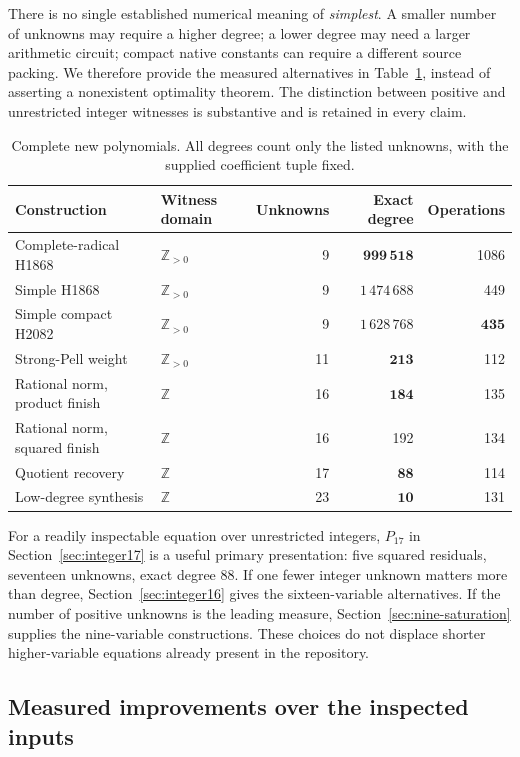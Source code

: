 \documentclass[11pt,a4paper]{article}
\newcommand{\Z}{\mathbb Z}
\newcommand{\Zp}{\mathbb Z_{>0}}
\theoremstyle{definition}
\theoremstyle{remark}
\numberwithin{equation}{section}
\begin{document}
There is no single established numerical meaning of \emph{simplest}. A smaller
number of unknowns may require a higher degree; a lower degree may need a
larger arithmetic circuit; compact native constants can require a different
source packing. We therefore provide the measured alternatives in
Table~\ref{tab:results}, instead of asserting a nonexistent optimality theorem.
The distinction between positive and unrestricted integer witnesses is
substantive and is retained in every claim.

\begin{table}[htbp]
\centering
\small
\begin{tabular}{llrrr}
\toprule
Construction & Witness domain & Unknowns & Exact degree & Operations\\
\midrule
Complete-radical H1868 & \(\Zp\) & 9 & \(\mathbf{999\,518}\) & 1086\\
Simple H1868 & \(\Zp\) & 9 & \(1\,474\,688\) & 449\\
Simple compact H2082 & \(\Zp\) & 9 & \(1\,628\,768\) & \(\mathbf{435}\)\\
Strong-Pell weight & \(\Zp\) & 11 & \(\mathbf{213}\) & 112\\
Rational norm, product finish & \(\Z\) & 16 & \(\mathbf{184}\) & 135\\
Rational norm, squared finish & \(\Z\) & 16 & 192 & 134\\
Quotient recovery & \(\Z\) & 17 & \(\mathbf{88}\) & 114\\
Low-degree synthesis & \(\Z\) & 23 & \(\mathbf{10}\) & 131\\
\bottomrule
\end{tabular}
\caption{Complete new polynomials. All degrees count only the listed
unknowns, with the supplied coefficient tuple fixed.}
\label{tab:results}
\end{table}

For a readily inspectable equation over unrestricted integers,
\(P_{17}\) in Section~\ref{sec:integer17} is a useful primary presentation:
five squared residuals, seventeen unknowns, exact degree 88. If one fewer
integer unknown matters more than degree, Section~\ref{sec:integer16}
gives the sixteen-variable alternatives. If the number of positive unknowns
is the leading measure, Section~\ref{sec:nine-saturation} supplies the
nine-variable constructions. These choices do not displace shorter
higher-variable equations already present in the repository.

\subsection{Measured improvements over the inspected inputs}
\end{document}
